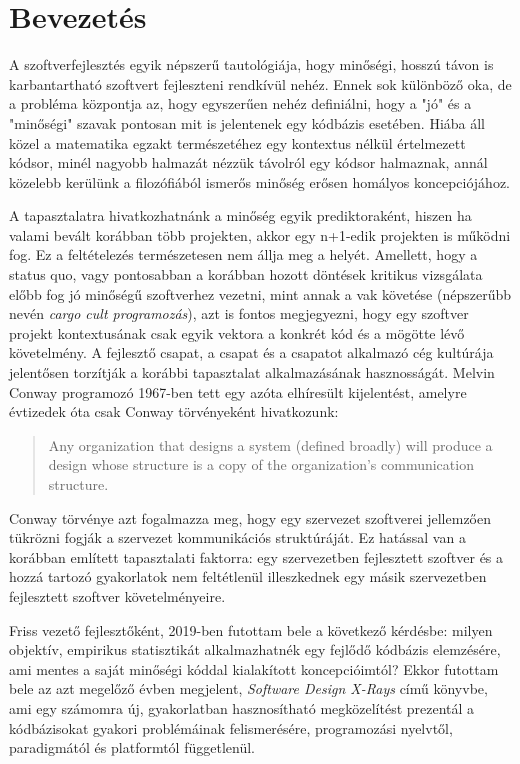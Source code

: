 \chapter{Bevezetés}
\label{ch:intro}

A szoftverfejlesztés egyik népszerű tautológiája, hogy minőségi, hosszú távon is karbantartható szoftvert fejleszteni rendkívül nehéz. Ennek sok különböző oka, de a probléma központja az, hogy egyszerűen nehéz definiálni, hogy a "jó" és a "minőségi" szavak pontosan mit is jelentenek egy kódbázis esetében. Hiába áll közel a matematika egzakt természetéhez egy kontextus nélkül értelmezett kódsor, minél nagyobb halmazát nézzük távolról egy kódsor halmaznak, annál közelebb kerülünk a filozófiából ismerős minőség erősen homályos koncepciójához.

A tapasztalatra hivatkozhatnánk a minőség egyik prediktoraként, hiszen ha valami bevált korábban több projekten, akkor egy n+1-edik projekten is működni fog. Ez a feltételezés természetesen nem állja meg a helyét. Amellett, hogy a status quo, vagy pontosabban a korábban hozott döntések kritikus vizsgálata előbb fog jó minőségű szoftverhez vezetni, mint annak a vak követése (népszerűbb nevén \textit{cargo cult programozás}), azt is fontos megjegyezni, hogy egy szoftver projekt kontextusának csak egyik vektora a konkrét kód és a mögötte lévő követelmény. A fejlesztő csapat, a csapat és a csapatot alkalmazó cég kultúrája jelentősen torzítják a korábbi tapasztalat alkalmazásának hasznosságát. Melvin Conway programozó 1967-ben tett egy azóta elhíresült kijelentést, amelyre évtizedek óta csak Conway törvényeként\cite{conway} hivatkozunk:
\begin{quotation}
    Any organization that designs a system (defined broadly) will produce a design whose structure is a copy of the organization's communication structure.
\end{quotation}

Conway törvénye azt fogalmazza meg, hogy egy szervezet szoftverei jellemzően tükrözni fogják a szervezet kommunikációs struktúráját. Ez hatással van a korábban említett tapasztalati faktorra: egy szervezetben fejlesztett szoftver és a hozzá tartozó gyakorlatok nem feltétlenül illeszkednek egy másik szervezetben fejlesztett szoftver követelményeire.

Friss vezető fejlesztőként, 2019-ben futottam bele a következő kérdésbe: milyen objektív, empirikus statisztikát alkalmazhatnék egy fejlődő kódbázis elemzésére, ami mentes a saját minőségi kóddal kialakított koncepcióimtól? Ekkor futottam bele az azt megelőző évben megjelent, \textit{Software Design X-Rays}\cite{tornhillXrays} című könyvbe, ami egy számomra új, gyakorlatban hasznosítható megközelítést prezentál a kódbázisokat gyakori problémáinak felismerésére, programozási nyelvtől, paradigmától és platformtól függetlenül.

